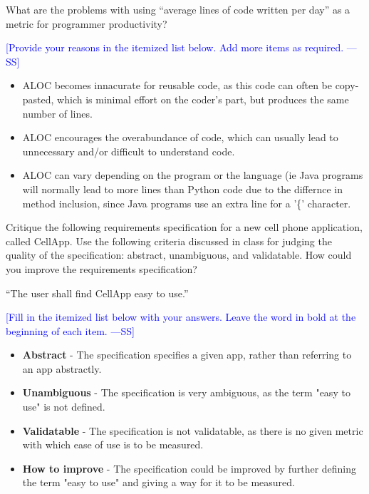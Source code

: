\documentclass[12pt,fleqn]{examtst}
\newcommand{\authornote}[3]{\textcolor{#1}{[#3 ---#2]}}
\newcommand{\authornote}[3]{}
\newcommand{\wss}[1]{\authornote{blue}{SS}{#1}}
\begin{document}

\renewcommand{\labelenumi}{\Alph{enumi}.}

\newpage


 What are the problems with using ``average lines of code
written per day'' as a metric for programmer productivity?

\bigskip

\noindent \wss{Provide your reasons in the itemized list below.  Add more items
  as required.}

\begin{itemize}
\item ALOC becomes innacurate for reusable code, as this code can often be copy-pasted, which is minimal effort on the coder's part, but produces the same number of lines.
\item ALOC encourages the overabundance of code, which can usually lead to unnecessary and/or difficult to understand code.
\item ALOC can vary depending on the program or the language (ie Java programs will normally lead to more lines than Python code due to the differnce in method inclusion, since Java programs use an extra line for a '\{' character.
\end{itemize}


\newpage

 Critique the following requirements specification
for a new cell phone application, called CellApp.  Use the following criteria
discussed in class for judging the quality of the specification: abstract,
unambiguous, and validatable.  How could you improve the requirements
specification?

\bigskip

``The user shall find CellApp easy to use.''

\bigskip

\noindent \wss{Fill in the itemized list below with your answers.  Leave the
  word in bold at the beginning of each item.}

\begin{itemize}
\item \textbf{Abstract} - The specification specifies a given app, rather than referring to an app abstractly.
\item \textbf{Unambiguous} - The specification is very ambiguous, as the term "easy to use" is not defined.
\item \textbf{Validatable} - The specification is not validatable, as there is no given metric with which ease of use is to be measured.
\item \textbf{How to improve} - The specification could be improved by further defining the term "easy to use" and giving a way for it to be measured.
\end{itemize}
\end{document}
